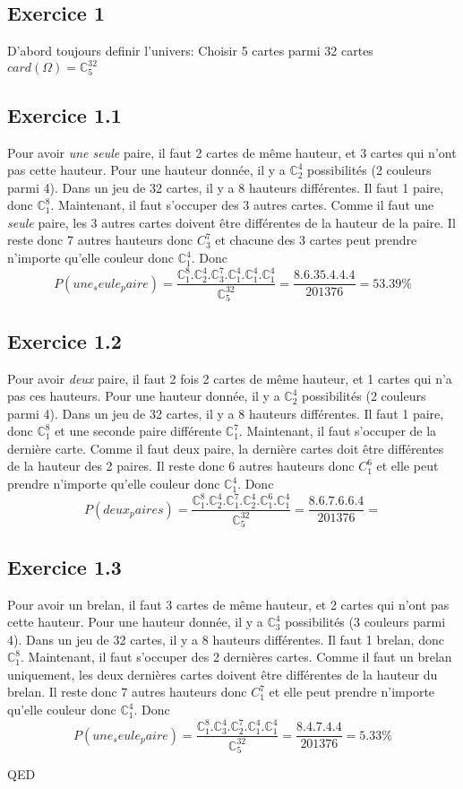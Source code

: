 \documentclass[]{book}
\theoremstyle{definition}
\newcommand{\bb}[1]{\mathbb{#1}}
\newcommand{\C}{\bb{C}}
\begin{document}
\subsection*{Exercice 1}
D'abord toujours definir l'univers: Choisir 5 cartes parmi 32 cartes $card(\Omega)=\C_5^32$

\subsection*{Exercice 1.1}
Pour avoir \emph{une seule} paire, il faut 2 cartes de m\^eme hauteur, et 3 cartes qui n'ont pas cette hauteur. Pour une hauteur donn\'ee, il y a $\C_2^4$ possibilit\'es (2 couleurs parmi 4). Dans un jeu de 32 cartes, il y a 8 hauteurs diff\'erentes. Il faut 1 paire, donc $\C_1^8$. Maintenant, il faut s'occuper des 3 autres cartes. Comme il faut une \emph{seule} paire, les 3 autres cartes doivent \^etre diff\'erentes de la hauteur de la paire. Il reste donc 7 autres hauteurs donc $C_3^7$ et chacune des 3 cartes peut prendre n'importe qu'elle couleur donc $\C_1^4$. Donc
$$P(une_seule_paire) = \frac{\C_1^8.\C_2^4.\C_3^7.\C_1^4.\C_1^4.\C_1^4}{\C_5^{32}} = \frac{8.6.35.4.4.4}{201376} = 53.39\%$$

\subsection*{Exercice 1.2}
Pour avoir \emph{deux} paire, il faut 2 fois 2 cartes de m\^eme hauteur, et 1 cartes qui n'a pas ces hauteurs. Pour une hauteur donn\'ee, il y a $\C_2^4$ possibilit\'es (2 couleurs parmi 4). Dans un jeu de 32 cartes, il y a 8 hauteurs diff\'erentes. Il faut 1 paire, donc $\C_1^8$ et une seconde paire diff\'erente $\C_1^7$. Maintenant, il faut s'occuper de la derni\`ere carte. Comme il faut deux paire, la derni\`ere cartes doit \^etre diff\'erentes de la hauteur des 2 paires. Il reste donc 6 autres hauteurs donc $C_1^6$ et elle peut prendre n'importe qu'elle couleur donc $\C_1^4$. Donc
$$P(deux_paires) = \frac{\C_1^8.\C_2^4.\C_1^7.\C_2^4.\C_1^6.\C_1^4}{\C_5^{32}} = \frac{8.6.7.6.6.4}{201376} = $$

\subsection*{Exercice 1.3}
Pour avoir un brelan, il faut 3 cartes de m\^eme hauteur, et 2 cartes qui n'ont pas cette hauteur. Pour une hauteur donn\'ee, il y a $\C_3^4$ possibilit\'es (3 couleurs parmi 4). Dans un jeu de 32 cartes, il y a 8 hauteurs diff\'erentes. Il faut 1 brelan, donc $\C_1^8$. Maintenant, il faut s'occuper des 2 derni\`eres cartes. Comme il faut un brelan uniquement, les deux derni\`eres cartes doivent \^etre diff\'erentes de la hauteur du brelan. Il reste donc 7 autres hauteurs donc $C_1^7$ et elle peut prendre n'importe qu'elle couleur donc $\C_1^4$. Donc
$$P(une_seule_paire) = \frac{\C_1^8.\C_3^4.\C_2^7.\C_1^4.\C_1^4}{\C_5^{32}} = \frac{8.4.7.4.4}{201376} = 5.33\%$$


  

QED
\end{document}
